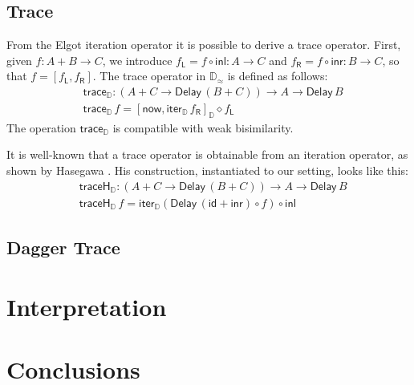 \documentclass[runningheads]{llncs}
\newcommand{\comp}{\circ}
\newcommand{\inl}{\mathsf{inl}}
\newcommand{\inr}{\mathsf{inr}}
\newcommand{\mapL}[1]{#1_{\mathsf{L}}}
\newcommand{\mapR}[1]{#1_{\mathsf{R}}}
\newcommand{\id}{\mathsf{id}}
\newcommand{\Delay}{\mathsf{Delay}\,}
\newcommand{\now}{\mathsf{now}}
\newcommand{\D}{\mathbb{D}}
\newcommand{\Dapprox}{\mathbb{D}_{\approx}}
\newcommand{\copairD}[2]{[#1,#2]_{\D}}
\newcommand{\iterD}{\mathsf{iter}_\D}
\newcommand{\traceD}{\mathsf{trace}_\D}
\newcommand{\traceHD}{\mathsf{traceH}_\D}
\begin{document}
\subsection{Trace}\label{sec:trace}

From the Elgot iteration operator it is possible to derive a trace
operator. First, given $f : A + B \to C$, we introduce
$\mapL f = f \comp \inl : A \to C$ and
$\mapR f = f \comp \inr : B \to C$, so that $f = [\mapL f , \mapR f]$.
The trace operator in $\Dapprox$ is defined as follows:
\begin{align*}
& \traceD : (A + C \to \Delay (B + C)) \to A \to \Delay B \\
& \traceD \,f = \copairD{\now}{\iterD \,\mapR f}\diamond \mapL f
\end{align*}
The operation $\traceD$ is compatible with weak bisimilarity. 


It is well-known that a trace operator is obtainable from an iteration
operator, as shown by Hasegawa  \cite{Hasegawa97}. His construction,
instantiated to our setting, looks like this:
\begin{align*}
& \traceHD : (A + C \to \Delay (B + C)) \to A \to \Delay B \\
& \traceHD \,f = \iterD (\Delay (\id + \inr) \comp f) \comp \inl
\end{align*}



\subsection{Dagger Trace}\label{sec:daggertrace}


\section{Interpretation}\label{sec:interpretation}

\section{Conclusions}


%
%
%
%
%
%


\end{document}
